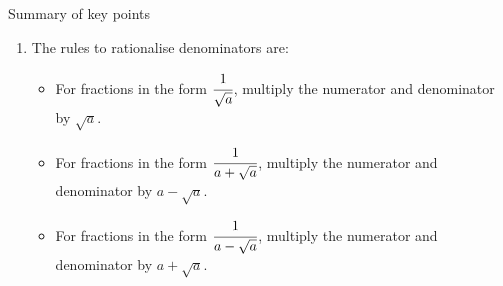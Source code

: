 \documentclass[fleqn]{article}
\begin{document}
\begin{mybox2}[colbacktitle=green]{Summary of key points}
\begin{enumerate}
\begin{multicols}{2}
\begin{itemize}
					\item $\sqrt{\strut ab}=\sqrt{\strut a}\times\sqrt{\strut b}$
				\end{itemize}
				\columnbreak
				\begin{itemize}
					\item[] $\sqrt{\cfrac{a}{b}}=\dfrac{\sqrt{a}}{\sqrt{b}}$
				\end{itemize}
			\end{multicols}
		\item The rules to rationalise denominators are:\vspace{-2mm}
		\begin{itemize}
			\setlength{\itemsep}{-3pt}
			\item For fractions in the form $\cfrac{1}{\sqrt{a}}$, multiply the numerator and denominator by $\sqrt{a}$.
			\item For fractions in the form $\cfrac{1}{a+\sqrt{a}}$, multiply the numerator and denominator by $a-\sqrt{a}$.
			\item For fractions in the form $\cfrac{1}{a-\sqrt{a}}$, multiply the numerator and denominator by $a+\sqrt{a}$.
		\end{itemize}
	\end{enumerate}
\end{mybox2}
\newpage
\end{document}
